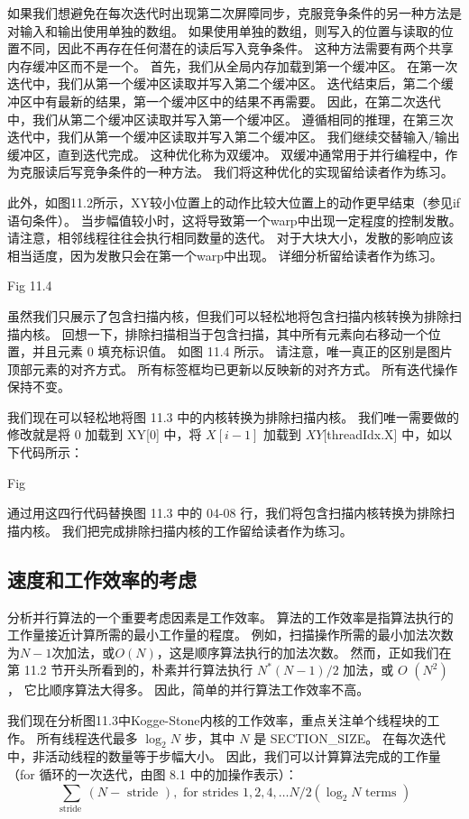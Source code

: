 如果我们想避免在每次迭代时出现第二次屏障同步，克服竞争条件的另一种方法是对输入和输出使用单独的数组。 
如果使用单独的数组，则写入的位置与读取的位置不同，因此不再存在任何潜在的读后写入竞争条件。 
这种方法需要有两个共享内存缓冲区而不是一个。 首先，我们从全局内存加载到第一个缓冲区。 
在第一次迭代中，我们从第一个缓冲区读取并写入第二个缓冲区。 
迭代结束后，第二个缓冲区中有最新的结果，第一个缓冲区中的结果不再需要。 
因此，在第二次迭代中，我们从第二个缓冲区读取并写入第一个缓冲区。 
遵循相同的推理，在第三次迭代中，我们从第一个缓冲区读取并写入第二个缓冲区。 我们继续交替输入/输出缓冲区，直到迭代完成。 
这种优化称为双缓冲。 双缓冲通常用于并行编程中，作为克服读后写竞争条件的一种方法。 我们将这种优化的实现留给读者作为练习。 

此外，如图11.2所示，$\mathrm{XY}$较小位置上的动作比较大位置上的动作更早结束（参见if语句条件）。 
当步幅值较小时，这将导致第一个warp中出现一定程度的控制发散。 请注意，相邻线程往往会执行相同数量的迭代。 
对于大块大小，发散的影响应该相当适度，因为发散只会在第一个warp中出现。 详细分析留给读者作为练习。

{\color{red} Fig 11.4}

虽然我们只展示了包含扫描内核，但我们可以轻松地将包含扫描内核转换为排除扫描内核。 
回想一下，排除扫描相当于包含扫描，其中所有元素向右移动一个位置，并且元素 0 填充标识值。 如图 11.4 所示。 
请注意，唯一真正的区别是图片顶部元素的对齐方式。 所有标签框均已更新以反映新的对齐方式。 所有迭代操作保持不变。

我们现在可以轻松地将图 11.3 中的内核转换为排除扫描内核。 
我们唯一需要做的修改就是将 0 加载到 XY[0] 中，将 $X[i-1]$ 加载到 $XY[$threadIdx.X] 中，如以下代码所示：

{\color{red} Fig}

通过用这四行代码替换图 11.3 中的 04-08 行，我们将包含扫描内核转换为排除扫描内核。 
我们把完成排除扫描内核的工作留给读者作为练习。

\subsection{速度和工作效率的考虑}
分析并行算法的一个重要考虑因素是工作效率。 算法的工作效率是指算法执行的工作量接近计算所需的最小工作量的程度。 
例如，扫描操作所需的最小加法次数为$N-1$次加法，或$O(N)$，这是顺序算法执行的加法次数。 
然而，正如我们在第 11.2 节开头所看到的，朴素并行算法执行 $N^{*}(N-1) / 2$ 加法，或 $O$ $\left(N^{2}\right)$ ，
它比顺序算法大得多。 因此，简单的并行算法工作效率不高。

我们现在分析图11.3中Kogge-Stone内核的工作效率，重点关注单个线程块的工作。 
所有线程迭代最多 $\log _{2} N$ 步，其中 $N$ 是 SECTION\_SIZE。 在每次迭代中，非活动线程的数量等于步幅大小。 
因此，我们可以计算算法完成的工作量（for 循环的一次迭代，由图 8.1 中的加操作表示）：
$$
\sum_{\text {stride }}(N-\text { stride }), \text { for strides } 1,2,4, \ldots N / 2\left(\log_{2} N \text { terms }\right)
$$

